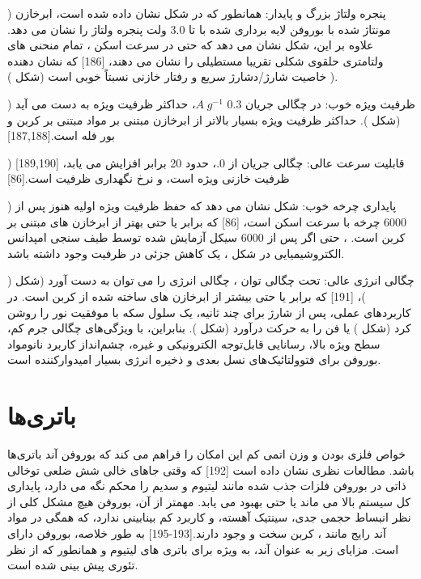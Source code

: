 ) پنجره ولتاژ بزرگ و پایدار: همانطور که در شکل  نشان داده شده است، ابرخازن مونتاژ شده با بوروفن لایه برداری شده با  تا 3.0 ولت پنجره ولتاژ را نشان می دهد. علاوه بر این، شکل  نشان می دهد که حتی در سرعت اسکن ، تمام منحنی های ولتامتری حلقوی شکلی تقریبا مستطیلی را نشان می دهند، \cite{luHTiO2MnO2HTiO22013}[186] که نشان دهنده خاصیت شارژ/دشارژ سریع و رفتار خازنی نسبتاً خوبی است (شکل ) ). 

) ظرفیت ویژه خوب: در چگالی جریان 0.3 $A\; g^{-1}$، حداکثر ظرفیت ویژه  به دست می آید (شکل ). حداکثر ظرفیت ویژه بسیار بالاتر از ابرخازن مبتنی بر مواد مبتنی بر کربن و بور فله است.[187\cite{liuElectrochemicalBehaviorGraphene2011, chenHighPerformanceSupercapacitors2011},188] 

) قابلیت سرعت عالی: چگالی جریان از 0.، حدود 20 برابر افزایش می یابد، [189,190] ظرفیت خازنی ویژه  است، و نرخ نگهداری ظرفیت  است.\cite{liScalableProductionFewLayer2018}[86] 

) پایداری چرخه خوب: شکل  نشان می دهد که حفظ ظرفیت ویژه اولیه هنوز  پس از 6000 چرخه با سرعت اسکن  است، \cite{liScalableProductionFewLayer2018}[86] که برابر یا حتی بهتر از ابرخازن های مبتنی بر کربن است. ، حتی اگر پس از 6000 سیکل آزمایش شده توسط طیف سنجی امپدانس الکتروشیمیایی در شکل ، یک کاهش جزئی در ظرفیت وجود داشته باشد. 

) چگالی انرژی عالی: تحت چگالی توان ، چگالی انرژی  را می توان به دست آورد (شکل )،\cite{shaoHighperformanceFlexibleAsymmetric2013} [191] که برابر یا حتی بیشتر از ابرخازن های ساخته شده از کربن است. در کاربردهای عملی، پس از شارژ برای چند ثانیه، یک سلول سکه با موفقیت نور را روشن کرد (شکل ) یا فن را به حرکت درآورد (شکل ). بنابراین، با ویژگی‌های چگالی جرم کم، سطح ویژه بالا، رسانایی قابل‌توجه الکترونیکی و غیره، چشم‌انداز کاربرد نانومواد بوروفن برای فتوولتائیک‌های نسل بعدی و ذخیره انرژی بسیار امیدوارکننده است.

\section{باتری‌ها}
خواص فلزی بودن و وزن اتمی کم این امکان را فراهم می کند که بوروفن آند باتری‌ها باشد. مطالعات نظری نشان داده است \cite{atacaHydrogenStorageCalcium2009}[192] که وقتی جاهای خالی شش ضلعی توخالی ذاتی در بوروفن فلزات جذب شده مانند لیتیوم و سدیم را محکم نگه می دارد، پایداری کل سیستم بالا می ماند یا حتی بهبود می یابد. مهمتر از آن، بوروفن هیچ مشکل کلی از نظر انبساط حجمی جدی، سینتیک آهسته، و کاربرد کم بینابینی ندارد، که همگی در مواد آند رایج مانند ، کربن سخت و  وجود دارند.\cite{ponrouchHighCapacityHard2013, alcantaraNiCo2O4SpinelFirst2002, liuUltrasmallSnNanoparticles2015}[193-195] به طور خلاصه، بوروفن دارای است. مزایای زیر به عنوان آند، به ویژه برای باتری های لیتیوم و  همانطور که از نظر تئوری پیش بینی شده است.
